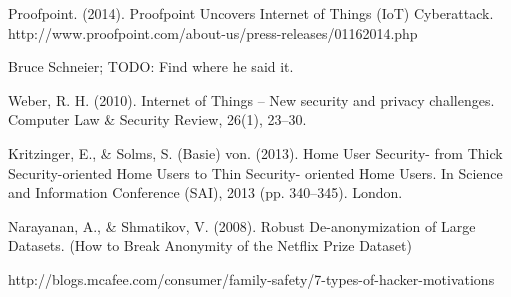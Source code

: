 \documentclass[10pt,journal,compsoc]{IEEEtran}
\begin{document}
\begin{thebibliography}{1}
Proofpoint. (2014). Proofpoint Uncovers Internet of Things (IoT) Cyberattack. http://www.proofpoint.com/about-us/press-releases/01162014.php

Bruce Schneier; TODO: Find where he said it.

Weber, R. H. (2010). Internet of Things – New security and privacy challenges. Computer Law \& Security Review, 26(1), 23–30. 

Kritzinger, E., \& Solms, S. (Basie) von. (2013). Home User Security- from Thick Security-oriented Home Users to Thin Security- oriented Home Users. In Science and Information Conference (SAI), 2013 (pp. 340–345). London.

Narayanan, A., \& Shmatikov, V. (2008). Robust De-anonymization of Large Datasets. (How to Break Anonymity of the Netflix Prize Dataset)

http://blogs.mcafee.com/consumer/family-safety/7-types-of-hacker-motivations

\end{thebibliography}



\end{document}
